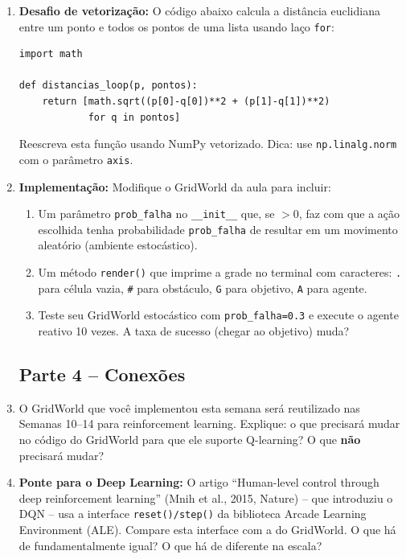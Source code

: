 \documentclass[12pt,a4paper]{article}
\begin{document}
\begin{enumerate}[label=\textbf{Q\arabic*.}, leftmargin=*]
\item \textbf{Desafio de vetorização:} O código abaixo calcula a distância euclidiana entre um ponto e todos os pontos de uma lista usando laço \texttt{for}:

\begin{lstlisting}
import math

def distancias_loop(p, pontos):
    return [math.sqrt((p[0]-q[0])**2 + (p[1]-q[1])**2)
            for q in pontos]
\end{lstlisting}

Reescreva esta função usando NumPy vetorizado. Dica: use \texttt{np.linalg.norm} com o parâmetro \texttt{axis}.

\item \textbf{Implementação:} Modifique o GridWorld da aula para incluir:

\begin{enumerate}
  \item Um parâmetro \texttt{prob\_falha} no \texttt{\_\_init\_\_} que, se $> 0$, faz com que a ação escolhida tenha probabilidade \texttt{prob\_falha} de resultar em um movimento aleatório (ambiente estocástico).
  \item Um método \texttt{render()} que imprime a grade no terminal com caracteres: \texttt{.} para célula vazia, \texttt{\#} para obstáculo, \texttt{G} para objetivo, \texttt{A} para agente.
  \item Teste seu GridWorld estocástico com \texttt{prob\_falha=0.3} e execute o agente reativo 10 vezes. A taxa de sucesso (chegar ao objetivo) muda?
\end{enumerate}

\subsection*{Parte 4 -- Conexões}

\item O GridWorld que você implementou esta semana será reutilizado nas Semanas 10--14 para reinforcement learning. Explique: o que precisará mudar no código do GridWorld para que ele suporte Q-learning? O que \textbf{não} precisará mudar?

\item \textbf{Ponte para o Deep Learning:} O artigo ``Human-level control through deep reinforcement learning'' (Mnih et al., 2015, Nature) -- que introduziu o DQN -- usa a interface \texttt{reset()/step()} da biblioteca Arcade Learning Environment (ALE). Compare esta interface com a do GridWorld. O que há de fundamentalmente igual? O que há de diferente na escala?

\end{enumerate}
\end{document}
